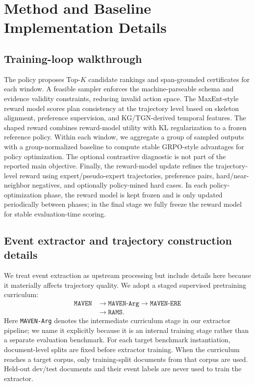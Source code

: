 \documentclass{article}
\begin{document}
\section{Method and Baseline Implementation Details}
\label{sec:app_method_details}
\subsection{Training-loop walkthrough}
\label{sec:app_reading_fig}

The policy proposes Top-$K$ candidate rankings and span-grounded certificates for each window.
A feasible sampler enforces the machine-parseable schema and evidence validity constraints, reducing invalid action space.
The MaxEnt-style reward model scores plan consistency at the trajectory level based on skeleton alignment, preference supervision, and KG/TGN-derived temporal features.
The shaped reward combines reward-model utility with KL regularization to a frozen reference policy.
Within each window, we aggregate a group of sampled outputs with a group-normalized baseline to compute stable GRPO-style advantages for policy optimization.
The optional contrastive diagnostic is not part of the reported main objective.
Finally, the reward-model update refines the trajectory-level reward using expert/pseudo-expert trajectories, preference pairs, hard/near-neighbor negatives, and optionally policy-mined hard cases.
In each policy-optimization phase, the reward model is kept frozen and is only updated periodically between phases; in the final stage we fully freeze the reward model for stable evaluation-time scoring.

\subsection{Event extractor and trajectory construction details}
\label{sec:app_extractor}

We treat event extraction as upstream processing but include details here because it materially affects trajectory quality.
We adopt a staged supervised pretraining curriculum:
\[
\begin{aligned}
\texttt{MAVEN} &\rightarrow \texttt{MAVEN-Arg} \rightarrow \texttt{MAVEN-ERE} \\
&\rightarrow \texttt{RAMS}.
\end{aligned}
\]
Here \texttt{MAVEN-Arg} denotes the intermediate curriculum stage in our extractor pipeline; we name it explicitly because it is an internal training stage rather than a separate evaluation benchmark.
For each target benchmark instantiation, document-level splits are fixed before extractor training.
When the curriculum reaches a target corpus, only training-split documents from that corpus are used.
Held-out dev/test documents and their event labels are never used to train the extractor.
\end{document}

